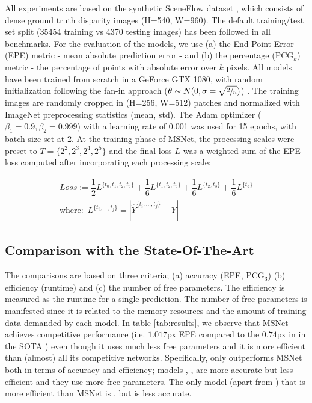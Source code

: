 \documentclass[runningheads]{llncs}
\begin{document}
All experiments are based on the synthetic SceneFlow dataset \cite{MIFDB16}, which consists of dense ground truth disparity images (H=540, W=960). The 
default training/test set split (35454 training vs 4370 testing images) has been followed in all benchmarks. For the evaluation of the models, we use (a) the End-Point-Error (EPE) metric - mean absolute prediction error - and (b) the percentage ($\text{PCG}_k$) metric - the percentage of points with absolute error over $k$ pixels. All models have been trained from scratch in a GeForce GTX 1080, with random initialization following the fan-in approach ($\theta \sim N(0,\sigma=\sqrt{\sfrac{2}{n}})$) \cite{He2015}. The training images are randomly cropped in (H=256, W=512) patches and normalized with ImageNet preprocessing statistics (mean, std). The Adam optimizer ($\beta_1 = 0.9, \beta_2=0.999$) with a learning rate of 0.001 was used for 15 epochs, with batch size set at 2. At the training phase of MSNet, the processing scales were preset to $T= \{2^2, 2^3, 2^4, 2^5\}$ and the final loss $L$ was a weighted sum of the EPE loss computed after incorporating each processing scale:

\begin{gather}
\textit{Loss} := \dfrac{1}{2}L^{\{t_0, t_1, t_2, t_3\}} +  \dfrac{1}{6}L^{\{t_1, t_2, t_3\}} + \dfrac{1}{6}L^{\{t_2, t_3\}} + \dfrac{1}{6}L^{\{t_3\}}\\
\text{where:} \; \ L^{\{t_i, ..., t_j\}} = |\hat{Y}^{\{t_i, ..., t_j\}} - Y |    
\end{gather}{}


\subsection{Comparison with the State-Of-The-Art}

The comparisons are based on three criteria; (a) accuracy (EPE, $\text{PCG}_3$) (b) efficiency (runtime) and (c) the number of free parameters. The efficiency is measured as the runtime for a single prediction. The number of free parameters is manifested since it is related to the memory resources and the amount of training data demanded by each model. In table \ref{tab:results}, we observe that MSNet achieves competitive performance (i.e. $1.017$px EPE compared to the $0.74$px in in the SOTA \cite{du2019amnet}) even though it uses much less free parameters and it is more efficient than (almost) all its competitive networks. Specifically, only \cite{Duggal2019ICCV} outperforms MSNet both in terms of accuracy and efficiency; models \cite{cheng2018learning}, \cite{du2019amnet}, \cite{zhang2019ga} are more accurate but less efficient and they use more free parameters. The only model (apart from \cite{Duggal2019ICCV}) that is more efficient than MSNet is \cite{Mayer2016ALD}, but is less accurate.
\end{document}
